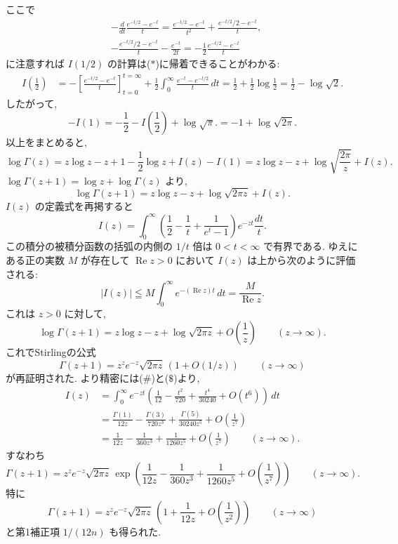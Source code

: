 \documentclass[12pt,twoside]{jarticle}
\renewcommand\Re{\operatorname{Re}}
\theoremstyle{jplain}
\theoremstyle{jplain}
\theoremstyle{jplain}
\numberwithin{theorem}{section}
\numberwithin{equation}{section}
\numberwithin{figure}{section}
\numberwithin{table}{section}
\begin{document}
ここで
\begin{align*}
&
-\frac{d}{dt}\frac{e^{-t/2}-e^{-t}}{t}
=\frac{e^{-t/2}-e^{-t}}{t^2}
+\frac{e^{-t/2}/2-e^{-t}}{t},
\\ &
-\frac{e^{-t/2}/2-e^{-t}}{t}-\frac{e^{-t}}{2t}
=-\frac{1}{2}\frac{e^{-t/2}-e^{-t}}{t}
\end{align*}
に注意すれば $I(1/2)$ の計算は($*$)に帰着できることがわかる:
\begin{align*}
I\left(\frac{1}{2}\right)
&
=-\left[\frac{e^{-t/2}-e^{-t}}{t}\right]_{t=0}^{t=\infty}
+\frac{1}{2}\int_0^\infty\frac{e^{-t}-e^{-t/2}}{t}\,dt
=\frac{1}{2}+\frac{1}{2}\log\frac{1}{2}
=\frac{1}{2}-\log\sqrt{2}.
\end{align*}
したがって,
\[
-I(1)
= -\frac{1}{2}-I\left(\frac{1}{2}\right)+\log\sqrt{\pi}.
= -1 + \log\sqrt{2\pi}.
\]
以上をまとめると,
\[
\log\Gamma(z)
=z\log z-z+1-\frac{1}{2}\log z + I(z)-I(1)
=z\log z-z+\log\sqrt{\frac{2\pi}{z}}+I(z).
\]
$\log\Gamma(z+1)=\log z+\log\Gamma(z)$ より,
\[
\log\Gamma(z+1)=z\log z - z + \log\sqrt{2\pi z}+I(z).
\]
$I(z)$ の定義式を再掲すると
\[
I(z)=
\int_0^\infty\left(\frac{1}{2}-\frac{1}{t}+\frac{1}{e^t-1}\right)e^{-zt}\frac{dt}{t}.
\]
この積分の被積分函数の括弧の内側の $1/t$ 倍は $0<t<\infty$ で有界である.
ゆえにある正の実数 $M$ が存在して $\Re z>0$ において $I(z)$ は上から次のように評価される:
\[
|I(z)|\leqq M\int_0^\infty e^{-(\Re z)t}\,dt = \frac{M}{\Re z}.
\]
これは $z>0$ に対して,
\[
\log\Gamma(z+1)=z\log z-z+\log\sqrt{2\pi z}+O\left(\frac{1}{z}\right)
\qquad (z\to\infty).
\]
これでStirlingの公式
\[
\Gamma(z+1) = z^z e^{-z}\sqrt{2\pi z} \,(1+O(1/z)) \qquad (z\to\infty)
\]
が再証明された. より精密には($\#$)と($\$$)より,
\begin{align*}
I(z)
&=\int_0^\infty
e^{-zt}
\left(\frac{1}{12}-\frac{t^2}{720}+\frac{t^4}{30240}+O(t^6)\right)\,dt
\\ &
=\frac{\Gamma(1)}{12z}-\frac{\Gamma(3)}{720z^3}+\frac{\Gamma(5)}{30240z^5}
+O\left(\frac{1}{z^7}\right)
\\ &
=\frac{1}{12z}-\frac{1}{360z^3}+\frac{1}{1260z^5}+O\left(\frac{1}{z^7}\right)
\qquad (z\to\infty).
\end{align*}
すなわち
\[
\Gamma(z+1)=z^z e^{-z}\sqrt{2\pi z}\,
\exp\left(\frac{1}{12z}-\frac{1}{360z^3}+\frac{1}{1260z^5}+O\left(\frac{1}{z^7}\right)\right)
\qquad (z\to\infty).
\]
特に
\[
\Gamma(z+1)=z^z e^{-z}\sqrt{2\pi z}\,
\left(1+\frac{1}{12z}+O\left(\frac{1}{z^2}\right)\right)
\qquad (z\to\infty)
\]
と第1補正項 $1/(12n)$ も得られた.

\end{document}
